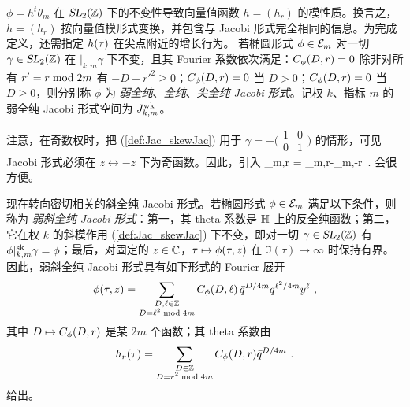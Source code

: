 
$\phi=h^t\theta_m$ 在 $\operatorname{\textsl{SL}}_2(\mathbb{Z})$ 下的不变性导致向量值函数 $h=(h_r)$ 的模性质。换言之，$h=(h_r)$ 按向量值模形式变换，并包含与 Jacobi 形式完全相同的信息。为完成定义，还需指定 $h(\tau)$ 在尖点附近的增长行为。
若椭圆形式 $\phi\in\mathcal{E}_m$ 对一切 $\gamma\in\operatorname{\textsl{SL}}_2(\mathbb{Z})$ 在 $\lvert_{k,m} \gamma$ 下不变，且其 Fourier 系数依次满足：$C_\phi(D,r)=0$ 除非对所有 $r'=r {\rm \;mod\;}{2m}$ 有 $-D+ r'^{2}\geq 0$；$C_\phi(D,r)=0$ 当 $D > 0$；$C_{\phi}(D,r)=0$ 当 $D \ge0$，则分别称 $\phi$ 为 {\it 弱全纯}、{\it 全纯}、{\it 尖全纯 Jacobi 形式}。记权 $k$、指标 $m$ 的弱全纯 Jacobi 形式空间为 $J^{\rm wk}_{k,m}$。


注意，在奇数权时，把 (\ref{def:Jac_skewJac}) 用于 $\gamma = - \big(\begin{smallmatrix} 1& 0 \\ 0&1\end{smallmatrix}\big)$ 的情形，可见 Jacobi 形式必须在 $z\leftrightarrow -z$ 下为奇函数。因此，引入
\be\label{def:thetahat}
\tilde\theta_{m,r} = \theta_{m,r}-\theta_{m,-r}~.
\ee
会很方便。


现在转向密切相关的斜全纯 Jacobi 形式。若椭圆形式 $\phi\in\mathcal{E}_m$ 满足以下条件，则称为 {\em 弱斜全纯 Jacobi 形式}：第一，其 theta 系数是 $\mathbb{H}$ 上的反全纯函数；第二，它在权 $k$ 的斜模作用 (\ref{def:Jac_skewJac}) 下不变，即对一切 $\gamma \in \operatorname{\textsl{SL}}_2(\mathbb{Z})$ 有 $\phi\lvert_{k,m}^{\rm sk}\gamma =\phi$；最后，对固定的 $z\in \mathbb{C}$，$\tau \mapsto \phi(\tau,z)$ 在 $\Im(\tau)\to \infty$ 时保持有界。因此，弱斜全纯 Jacobi 形式具有如下形式的 Fourier 展开
\begin{gather}\label{eqn:jac:hol-DFoucffskw}
\phi(\tau,z) = 
\sum_{\substack{D,\ell \in \mathbb{Z}\\  D=\ell ^2  {\rm \;mod\;} 4m} }C_\phi(D,\ell )\, 
\bar q^{D/4m} q^{\ell ^2/4m} y^\ell ~,
\end{gather}
其中 $D\mapsto C_\phi(D,r)$ 是某 $2m$ 个函数；其 theta 系数由
\begin{gather}\label{eqn:jac:hol-thtcoeffFoucoeff-skew}
h_r(\tau)=\sum_{\substack{D\in\mathbb{Z}\\D=r^2{\rm \;mod\;} 4m}}C_\phi(D,r)\bar q^{D/4m}~.
\end{gather}
给出。

